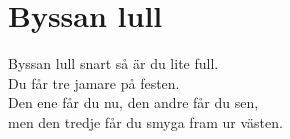 \section{Byssan lull}
Byssan lull snart så är du lite full.\\
Du får tre jamare på festen.\\
Den ene får du nu, den andre får du sen,\\
men den tredje får du smyga fram ur västen.\\